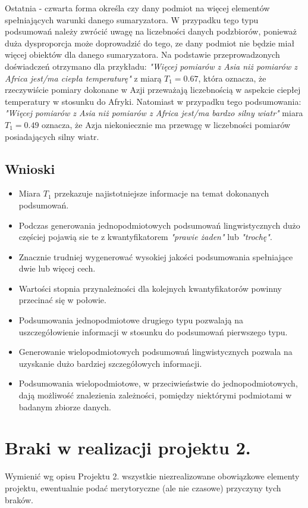 \documentclass{article}
\begin{document}
Ostatnia - czwarta forma określa czy dany podmiot na więcej elementów spełniających warunki danego sumaryzatora. W przypadku tego typu podsumowań należy zwrócić uwagę na liczebności danych podzbiorów, ponieważ duża dysproporcja może doprowadzić do tego, ze dany podmiot nie będzie miał więcej obiektów dla danego sumaryzatora. Na podstawie przeprowadzonych doświadczeń otrzymano dla przykładu: \textit{"Więcej pomiarów z Asia niż pomiarów z Africa jest/ma ciepła temperaturę"} z miarą \(T_1 = 0.67\), która oznacza, że rzeczywiście pomiary dokonane w Azji przeważają liczebnością w aspekcie ciepłej temperatury w stosunku do Afryki. Natomiast w przypadku tego podsumowania: \textit{"Więcej pomiarów z Asia niż pomiarów z Africa jest/ma bardzo silny wiatr"} miara \(T_1 = 0.49\) oznacza, że Azja niekoniecznie ma przewagę w liczebności pomiarów posiadających silny wiatr.

\subsection{Wnioski}
\begin{itemize}
    \item Miara \(T_1\) przekazuje najistotniejsze informacje na temat dokonanych podsumowań. 
    \item Podczas generowania jednopodmiotowych podsumowań lingwistycznych dużo częściej pojawią sie te z kwantyfikatorem \textit{"prawie żaden"} lub \textit{"trochę"}.
    \item Znacznie trudniej wygenerować wysokiej jakości podsumowania spełniające dwie lub więcej cech.
    \item Wartości stopnia przynależności dla kolejnych kwantyfikatorów powinny przecinać się w połowie.
    \item Podsumowania jednopodmiotowe drugiego typu pozwalają na uszczegółowienie informacji w stosunku do podsumowań pierwszego typu.
    \item Generowanie wielopodmiotowych podsumowań lingwistycznych pozwala na uzyskanie dużo bardziej szczegółowych informacji.
    \item Podsumowania wielopodmiotowe, w przeciwieństwie do jednopodmiotowych, dają możliwość znalezienia zależności, pomiędzy niektórymi podmiotami w badanym zbiorze danych. 
\end{itemize}


\section{Braki w realizacji projektu 2.}
Wymienić wg opisu Projektu 2. wszystkie niezrealizowane obowiązkowe elementy projektu, ewentualnie
podać merytoryczne (ale nie czasowe) przyczyny tych braków. 
\end{document}
